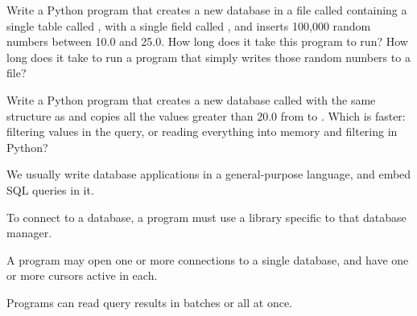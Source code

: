 \begin{challenge}
  Write a Python program that creates a new database in a file called
   containing a single table called
  , with a single field called , and
  inserts 100,000 random numbers between 10.0 and 25.0. How long does it
  take this program to run? How long does it take to run a program that
  simply writes those random numbers to a file?
\end{challenge}

\begin{challenge}
  Write a Python program that creates a new database called
   with the same structure as  and
  copies all the values greater than 20.0 from  to
  . Which is faster: filtering values in the query, or
  reading everything into memory and filtering in Python?
\end{challenge}

\begin{keypoints}
\begin{swcitemize}
\item
  We usually write database applications in a general-purpose language,
  and embed SQL queries in it.
\item
  To connect to a database, a program must use a library specific to
  that database manager.
\item
  A program may open one or more connections to a single database, and
  have one or more cursors active in each.
\item
  Programs can read query results in batches or all at once.
\end{swcitemize}
\end{keypoints}
